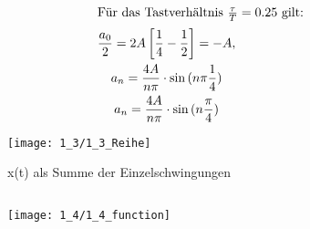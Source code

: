 \documentclass[a4paper, 12pt]{article}
\begin{document}
\subsection{}

\begin{gather*}
	\intertext{Für das Tastverhältnis $\frac{\tau}{T} = 0.25$  gilt:}
	\frac{a_0}{2} = 2 A \left[ \frac{1}{4} - \frac{1}{2}\right] = - A ,\\
	a_n = \frac{4 A}{n \pi} \cdot \sin{(n \pi \frac{1}{4})}\\
	a_n = \frac{4 A}{n \pi} \cdot \sin{(n \frac{\pi}{4})}
\end{gather*}

\begin{figure}[H]
  \texttt{[image: 1\_3/1\_3\_Reihe]}
	\caption{x(t) als Summe der Einzelschwingungen}
\end{figure}


\subsection{}
\begin{figure}[H]
  \texttt{[image: 1\_4/1\_4\_function]}
\end{figure}
\end{document}
